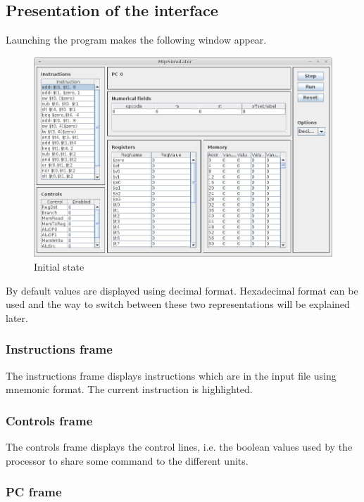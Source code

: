 \subsection{Presentation of the interface}

	Launching the program makes the following window appear.
	\begin{figure}[H]
		\centering
		\includegraphics[scale=0.6]{img/main_window_s0.png}
		\caption{Initial state}
		\label{fig:ini_state}		
	\end{figure}
	
	By default values are displayed using decimal format. Hexadecimal format can be used and the way to switch between these two representations will be explained later.
	
	\subsubsection{Instructions frame}
	
		The instructions frame displays instructions which are in the input file using mnemonic format. The current instruction is highlighted. 

	\subsubsection{Controls frame}
	
		The controls frame displays the control lines, i.e. the boolean values used by the processor to share some command to the different units.
		
	\subsubsection{PC frame}
	
